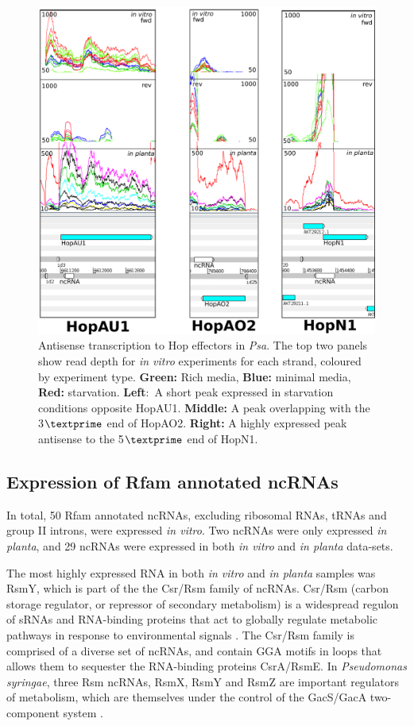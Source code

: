  \hfill
\begin{figure}[H]
    \includegraphics[scale=1.25]{psa/psa_ncRNA/antisense_hop.png}
    \caption[Antisense transcription to Hop effectors in \textit{Psa}]{Antisense transcription to Hop effectors in \textit{Psa}. The top two panels show read depth for \textit{in vitro} experiments for each strand, coloured by experiment type. \textbf{Green:} Rich media, \textbf{Blue:} minimal media, \textbf{Red:} starvation. \textbf{Left$:$} A short peak expressed in starvation conditions opposite HopAU1. \textbf{Middle:} A peak overlapping with the 3$\textprime$ end of HopAO2. \textbf{Right:} A highly expressed peak antisense to the 5$\textprime$ end of HopN1.}
    \label{fig:hop_antisense}
\end{figure}


\subsection{Expression of Rfam annotated ncRNAs}

In total, 50 Rfam annotated ncRNAs, excluding ribosomal RNAs, tRNAs and group II introns, were expressed \textit{in vitro}. Two ncRNAs were only expressed \textit{in planta}, and 29 ncRNAs were expressed in both \textit{in vitro} and \textit{in planta} data-sets.

The most highly expressed RNA in both \textit{in vitro} and \textit{in planta} samples was RsmY, which is part of the the Csr/Rsm family of ncRNAs. Csr/Rsm (carbon storage regulator, or repressor of secondary metabolism) is a widespread regulon of sRNAs and RNA-binding proteins that act to globally regulate metabolic pathways in response to environmental signals \citep{Duss2014-rs}. The Csr/Rsm family is comprised of a diverse set of ncRNAs, and contain GGA motifs in loops that allows them to sequester the RNA-binding proteins CsrA/RsmE. In \textit{Pseudomonas syringae}, three Rsm ncRNAs, RsmX, RsmY and RsmZ \citep{Janssen2018-fv,Moll2010-lt} are important regulators of metabolism, which are themselves under the control of the GacS/GacA two-component system \citep{Brencic2009-hn}.

